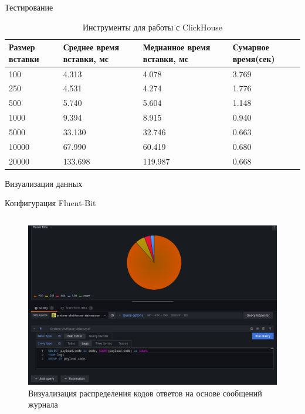 \documentclass{beamer}
\begin{document}
\begin{frame}{Тестирование}
	\begin{table}[H]
		\caption{\centering Инструменты для работы с ClickHouse}
		\centering
		\begin{tabularx}{\textwidth}{|X|X|X|l|}
			\hline
			\textbf{Размер вставки} & \textbf{Среднее время вставки, мс} & \textbf{Медианное время вставки, мс} & \textbf{Сумарное время(сек)} \\ \hline
			100                     & 4.313                              & 4.078                                & 3.769                        \\ \hline
			250                     & 4.531                              & 4.274                                & 1.776                        \\ \hline
			500                     & 5.740                              & 5.604                                & 1.148                        \\ \hline
			1000                    & 9.394                              & 8.915                                & 0.940                        \\ \hline
			5000                    & 33.130                             & 32.746                               & 0.663                        \\ \hline
			10000                   & 67.990                             & 60.419                               & 0.680                        \\ \hline
			20000                   & 133.698                            & 119.987                              & 0.668                        \\ \hline
		\end{tabularx}
	\end{table}



\end{frame}


\begin{frame}{Визуализация данных}
	\begin{listing}[H]
		\caption{Конфигурация Fluent-Bit}
		\inputminted[style=bw, frame=single,fontsize = \small, linenos=true, xleftmargin = 1.5em, breaklines=true]{sql}{./listings/codes.sql}
	\end{listing}
	\begin{figure}[H]
		\centering
		\includegraphics[width=.5\textwidth]{./imgs/nginx_grafana_status_codes.png}
		\caption{Визуализация распределения кодов ответов на основе сообщений журнала}
	\end{figure}

\end{frame}
\end{document}
